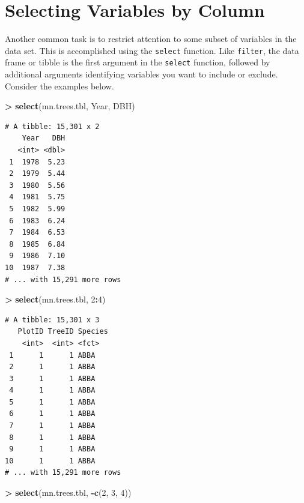 \documentclass[]{krantz}
\makeatletter
\newenvironment{Shaded}{\begin{snugshade}}{\end{snugshade}}
\newcommand{\KeywordTok}[1]{\textcolor[rgb]{0.27,0.27,0.27}{\textbf{#1}}}
\newcommand{\DecValTok}[1]{\textcolor[rgb]{0.06,0.06,0.06}{#1}}
\newcommand{\StringTok}[1]{\textcolor[rgb]{0.5,0.5,0.5}{#1}}
\newcommand{\OperatorTok}[1]{\textcolor[rgb]{0.43,0.43,0.43}{\textbf{#1}}}
\newcommand{\NormalTok}[1]{#1}
\newenvironment{kframe}{%
\medskip{}
\setlength{\fboxsep}{.8em}
 \def\at@end@of@kframe{}%
 \ifinner\ifhmode%
  \def\at@end@of@kframe{\end{minipage}}%
  \begin{minipage}{\columnwidth}%
 \fi\fi%
 \def\FrameCommand##1{\hskip\@totalleftmargin \hskip-\fboxsep
 \colorbox{shadecolor}{##1}\hskip-\fboxsep
     \hskip-\linewidth \hskip-\@totalleftmargin \hskip\columnwidth}%
 \MakeFramed {\advance\hsize-\width
   \@totalleftmargin\z@ \linewidth\hsize
   \@setminipage}}%
 {\par\unskip\endMakeFramed%
 \at@end@of@kframe}
\renewenvironment{Shaded}{\begin{kframe}}{\end{kframe}}
\theoremstyle{definition}
\theoremstyle{definition}
\theoremstyle{definition}
\theoremstyle{remark}
\makeatother
\begin{document}
\section{Selecting Variables by
Column}\label{selecting-variables-by-column}

Another common task is to restrict attention to some subset of variables
in the data set. This is accomplished using the \texttt{select}
function. Like \texttt{filter}, the data frame or tibble is the first
argument in the \texttt{select} function, followed by additional
arguments identifying variables you want to include or exclude. Consider
the examples below.

\begin{Shaded}
\begin{Highlighting}[]
\OperatorTok{>}\StringTok{ }\KeywordTok{select}\NormalTok{(mn.trees.tbl, Year, DBH)}
\end{Highlighting}
\end{Shaded}

\begin{verbatim}
# A tibble: 15,301 x 2
    Year   DBH
   <int> <dbl>
 1  1978  5.23
 2  1979  5.44
 3  1980  5.56
 4  1981  5.75
 5  1982  5.99
 6  1983  6.24
 7  1984  6.53
 8  1985  6.84
 9  1986  7.10
10  1987  7.38
# ... with 15,291 more rows
\end{verbatim}

\begin{Shaded}
\begin{Highlighting}[]
\OperatorTok{>}\StringTok{ }\KeywordTok{select}\NormalTok{(mn.trees.tbl, }\DecValTok{2}\OperatorTok{:}\DecValTok{4}\NormalTok{)}
\end{Highlighting}
\end{Shaded}

\begin{verbatim}
# A tibble: 15,301 x 3
   PlotID TreeID Species
    <int>  <int> <fct>  
 1      1      1 ABBA   
 2      1      1 ABBA   
 3      1      1 ABBA   
 4      1      1 ABBA   
 5      1      1 ABBA   
 6      1      1 ABBA   
 7      1      1 ABBA   
 8      1      1 ABBA   
 9      1      1 ABBA   
10      1      1 ABBA   
# ... with 15,291 more rows
\end{verbatim}

\begin{Shaded}
\begin{Highlighting}[]
\OperatorTok{>}\StringTok{ }\KeywordTok{select}\NormalTok{(mn.trees.tbl, }\OperatorTok{-}\KeywordTok{c}\NormalTok{(}\DecValTok{2}\NormalTok{, }\DecValTok{3}\NormalTok{, }\DecValTok{4}\NormalTok{))}
\end{Highlighting}
\end{Shaded}
\end{document}
